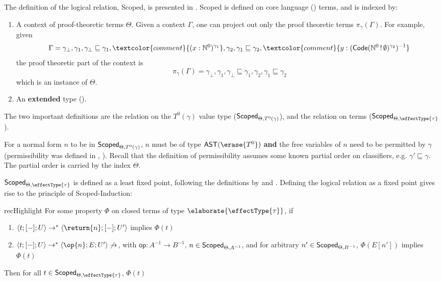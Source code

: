 The definition of the logical relation, \textsf{Scoped}, is presented in . \textsf{Scoped} is defined on core language (\coreLang{}) terms, and is indexed by:
\begin{enumerate}
  \item A context of proof-theoretic terms $\Theta$. Given a context $\Gamma$, one can project out only the proof theoretic terms $\pi_{\gamma}({\Gamma})$. For example, given 
  \[\Gamma = \gamma_\bot, \gamma_1, \gamma_\bot \sqsubseteq \gamma_1, \textcolor{comment}{(x:\mathbb{N}^0)^{\gamma_1}}, \gamma_2, \gamma_1 \sqsubseteq \gamma_2,  \textcolor{comment}{y:(\textsf{Code}(\mathbb{N}^0 \, ! \, \emptyset)^{\gamma_2})^{-1}}\]
  the proof theoretic part of the context is
  \[\pi_{\gamma}({\Gamma}) = \gamma_\bot, \gamma_1, \gamma_\bot \sqsubseteq \gamma_1, \gamma_2, \gamma_1 \sqsubseteq \gamma_2 \]
  which is an instance of $\Theta$.
  \item An \textbf{extended} \recLang{} type (). 
\end{enumerate}

The two important definitions are the relation on the $T^{0} (\gamma)$ value type ($\textsf{Scoped}_{{\Theta}, {T^{0} (\gamma)}}$), and the relation on terms ($\scoped{\effectType{\tau}}$). 

For a normal form $n$ to be in $\textsf{Scoped}_{{\Theta}, {T^{0} (\gamma)}}$, $n$ must be of type $\textsf{AST}(\erase{T^0})$ \textbf{and} the free variables of $n$ need to be permitted by $\gamma$ (permissibility was defined in , ). Recall that the definition of permissibility assumes some known partial order on classifiers, e.g. $\gamma' \sqsubseteq \gamma$. The partial order is carried by the index $\Theta$. 

$\scoped{\effectType{\tau}}$ is defined as a least fixed point, following the definitions by \citet{plotkin-2025} and \citet{kuchta-2023}. Defining the logical relation as a fixed point gives rise to the principle of \textsf{Scoped}-Induction:

\begin{definition}{recHighlight}
  For some property $\Phi$ on closed terms of type $\elaborate{\effectType{\tau}}$, if
  \begin{enumerate}
    \item $\langle t; [-]; U \rangle \to^{*} \langle \return{n};[-];U' \rangle$ implies $\Phi(t)$
    \item $\langle t; [-]; U \rangle \to^{*} \langle \op{n};E;U' \rangle \not\to$, with $\textsf{op}: A^{-1} \to B^{-1}$, $n \in \textsf{Scoped}_{{\Theta}, {A^{-1}}}$, and for arbitrary $n' \in \textsf{Scoped}_{{\Theta}, {B^{-1}}}$, $\Phi(E[n'])$ implies $\Phi(t)$
  \end{enumerate}
  Then for all $t \in \scoped{\effectType{\tau}}$, $\Phi(t)$
\end{definition}

